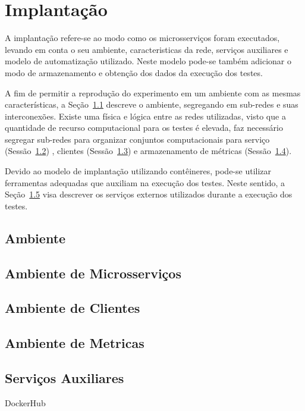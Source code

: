 \chapter{Implantação}
\label{cap6}

A implantação refere-se ao modo como os microsserviços foram executados, levando em conta o seu ambiente, caracteristicas da rede, serviços auxiliares e modelo de automatização utilizado.
%
Neste modelo pode-se também adicionar o modo de armazenamento e obtenção dos dados da execução dos testes.

A fim de permitir a reprodução do experimento em um ambiente com as mesmas características, a Seção~\ref{sec:ambiente} descreve o ambiente, segregando em sub-redes e suas interconexões.
%
Existe uma física e lógica entre as redes utilizadas, visto que a quantidade de recurso computacional para os testes é elevada, faz necessário segregar sub-redes para organizar conjuntos computacionais para serviço (Sessão~\ref{sec:ambiente_mic}) , clientes (Sessão~\ref{sec:ambiente_cli}) e armazenamento de métricas (Sessão~\ref{sec:ambiente_met}).

Devido ao modelo de implantação utilizando contêineres, pode-se utilizar ferramentas adequadas que auxiliam na execução dos testes.
%
Neste sentido, a Seção~\ref{sec:servicos_aux} visa descrever os serviços externos utilizados durante a execução dos testes.


\section{Ambiente}
\label{sec:ambiente}

\section{Ambiente de Microsserviços}
\label{sec:ambiente_mic}

\section{Ambiente de Clientes}
\label{sec:ambiente_cli}

\section{Ambiente de Metricas}
\label{sec:ambiente_met}

\section{Serviços Auxiliares}
\label{sec:servicos_aux}
DockerHub
